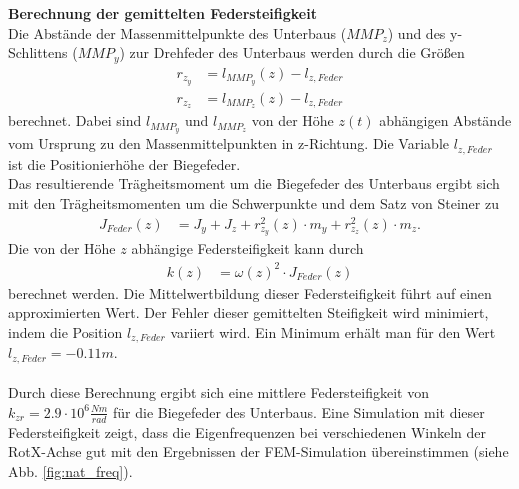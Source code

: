 \documentclass[10pt,a4paper]{iace.report}
\begin{document}
					\textbf{Berechnung der gemittelten Federsteifigkeit}\\ 
					Die Abstände der Massenmittelpunkte des Unterbaus ($ MMP_{z} $) und des y-Schlittens ($ MMP_{y} $) zur Drehfeder des Unterbaus werden durch die Größen 
					\begin{align*}
						r_{z_{y}} &= l_{MMP_{y}}(z) - l_{z,Feder} \\
						r_{z_{z}} &= l_{MMP_{z}}(z) - l_{z,Feder}
					\end{align*}
					berechnet. Dabei sind $ l_{MMP_{y}}$ und $ l_{MMP_{z}} $ von der Höhe $ z(t) $ abhängigen Abstände vom Ursprung zu den Massenmittelpunkten in z-Richtung. Die Variable $ l_{z,Feder} $ ist die Positionierhöhe der Biegefeder.\\	
					Das resultierende Trägheitsmoment um die Biegefeder des Unterbaus ergibt sich mit den Trägheitsmomenten um die Schwerpunkte und dem Satz von Steiner zu
					\begin{align*}
						J_{Feder}(z) &= J_{y} + J_{z} + r_{z_{y}}^{2}(z)\cdot m_{y} + r_{z_{z}}^{2}(z)\cdot m_{z}.
					\end{align*}
					Die von der Höhe $ z $ abhängige Federsteifigkeit kann durch
					\begin{align*}
						k(z) &= \omega(z)^{2} \cdot J_{Feder}(z) 
					\end{align*}
					berechnet werden. Die Mittelwertbildung dieser Federsteifigkeit führt auf einen approximierten Wert. Der Fehler dieser gemittelten Steifigkeit wird minimiert, indem die Position $ l_{z,Feder} $ variiert wird. Ein Minimum erhält man für den Wert $  l_{z,Feder}=-0.11m $.\\\\
					Durch diese Berechnung ergibt sich eine mittlere Federsteifigkeit von $ k_{zr} = 2.9\cdot 10^{6} \frac{Nm}{rad} $ für die Biegefeder des Unterbaus. Eine Simulation mit dieser Federsteifigkeit zeigt, dass die Eigenfrequenzen bei verschiedenen Winkeln der RotX-Achse gut mit den Ergebnissen der FEM-Simulation übereinstimmen (siehe Abb. \ref{fig:nat_freq}).
\end{document}
